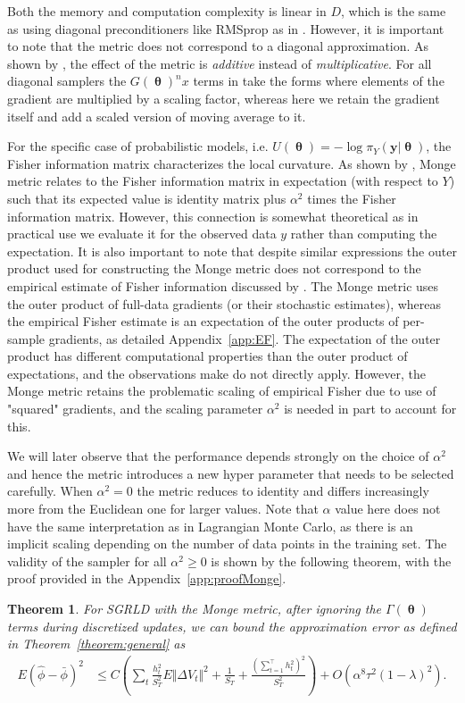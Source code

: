 \documentclass[10pt]{article} %
\DeclareMathOperator{\btheta}{\boldsymbol{\theta}}
\theoremstyle{plain}
\newtheorem{theorem}{Theorem}[section]
\theoremstyle{definition}
\theoremstyle{remark}
\begin{document}
Both the memory and computation complexity is linear in $D$, which is the same as using diagonal preconditioners like RMSprop as in \cite{Li2016}. However, it is important to note that the metric does not correspond to a diagonal approximation. As shown by , the effect of the metric is \emph{additive} instead of \emph{multiplicative}. For all diagonal samplers the $G(\btheta)^{n}x$ terms in  take the forms where elements of the gradient are multiplied by a scaling factor, whereas here we retain the gradient itself and add a scaled version of moving average to it.

For the specific case of probabilistic models, i.e. $U(\btheta)=-\log\pi_{Y}(\boldsymbol{y}|\btheta)$, the Fisher information matrix characterizes the local curvature. As shown by \citet{Hartmann2022}, Monge metric relates to the Fisher information matrix in expectation (with respect to $Y$) such that its expected value is identity matrix plus $\alpha^{2}$ times the Fisher information matrix. However, this connection is somewhat theoretical as in practical use we evaluate it for the observed data $y$ rather than computing the expectation. It is also important to note that despite similar expressions the outer product used for constructing the Monge metric does not correspond to the empirical estimate of Fisher information discussed by \citet{Kunstner2019}. The Monge metric uses the outer product of full-data gradients (or their stochastic estimates), whereas the empirical Fisher estimate is an expectation of the outer products of per-sample gradients, as detailed Appendix~\ref{app:EF}. The expectation of the outer product has different computational properties than the outer product of expectations, and the observations \citet{Kunstner2019} make do not directly apply. However, the Monge metric retains the problematic scaling of empirical Fisher due to use of "squared" gradients, and the scaling parameter $\alpha^2$ is needed in part to account for this.

We will later observe that the performance depends strongly on the choice of $\alpha^{2}$ and hence the metric introduces a new hyper parameter that needs to be selected carefully. When $\alpha^{2}=0$ the metric reduces to identity and differs increasingly more from the Euclidean one for larger values. Note that $\alpha$ value here does not have the same interpretation as in Lagrangian Monte Carlo, as there is an implicit scaling depending on the number of data points in the training set. The validity of the sampler for all $\alpha^{2} \ge 0$ is shown by the following theorem, with the proof provided in the Appendix~\ref{app:proofMonge}.
\begin{theorem}
For SGRLD with the Monge metric, after ignoring the $\Gamma(\btheta)$ terms during discretized updates, we can bound the approximation error as defined in Theorem~\ref{theorem:general} as
\begin{align*}
E\left(\hat{\phi}-\bar{\phi}\right)^{2} &\leq C\left(\sum_{t}\frac{h_{t}^2}{S_{T}^{2}}E\Vert\Delta V_{t}\Vert^{2}+\frac{1}{S_T}+\frac{(\sum_{t=1}^{\top}h_{t}^2)^{2}}{S_{T}^2}\right) + O(\alpha^{8}\tau^{2}(1-\lambda)^2).
\end{align*}
\end{theorem}
\end{document}
